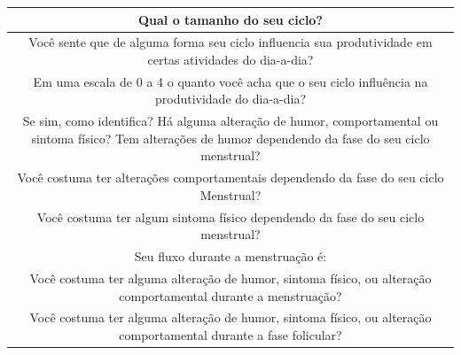 \begin{table}[ht]
\begin{tabular}{c}
        \midrule
        \begin{minipage} [t] {1\textwidth}  Qual o tamanho do seu ciclo? \end{minipage}\\
        \midrule
        \begin{minipage} [t] {1\textwidth}  Você sente que de alguma forma seu ciclo influencia sua produtividade em certas atividades do dia-a-dia? \end{minipage}\\
        \midrule
        \begin{minipage} [t] {1\textwidth}  Em uma escala de 0 a 4 o quanto você acha que o seu ciclo influência na produtividade do dia-a-dia? \end{minipage}\\
        \midrule
        \begin{minipage} [t] {1\textwidth} Se sim, como identifica? Há alguma alteração de humor, comportamental ou sintoma físico? Tem alterações de humor dependendo da fase do seu ciclo menstrual? \end{minipage}\\
        \midrule
        \begin{minipage} [t] {1\textwidth} Você costuma ter alterações comportamentais dependendo da fase do seu ciclo Menstrual? \end{minipage}\\
        \midrule
        \begin{minipage} [t] {1\textwidth} Você costuma ter algum sintoma físico dependendo da fase do seu ciclo menstrual? \end{minipage}\\
        \midrule
        \begin{minipage} [t] {1\textwidth} Seu fluxo durante a menstruação é:\end{minipage}\\
        \midrule
        \begin{minipage} [t] {1\textwidth} Você costuma ter alguma alteração de humor, sintoma físico, ou alteração comportamental durante a menstruação? \end{minipage}\\
        \midrule
        \begin{minipage} [t] {1\textwidth} Você costuma ter alguma alteração de humor, sintoma físico, ou alteração comportamental durante a fase folicular? \end{minipage}\\
        \midrule

\end{tabular}
\end{table}
